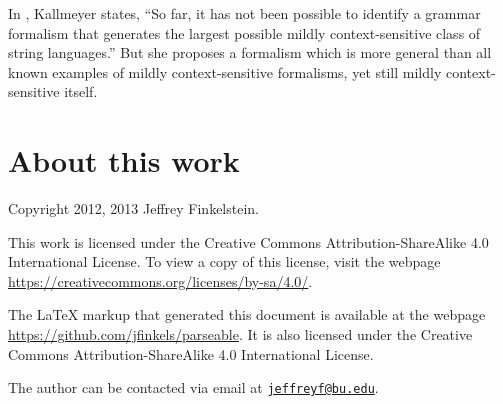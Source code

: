 \documentclass{article}
\theoremstyle{definition}
\newcommand{\email}[1]{\href{mailto:#1}{\nolinkurl{#1}}}
\begin{document}
In \cite{kallmeyer}, Kallmeyer states, ``So far, it has not been possible to identify a grammar formalism that generates the largest possible mildly context-sensitive class of string languages.''
But she proposes a formalism which is more general than all known examples of mildly context-sensitive formalisms, yet still mildly context-sensitive itself.

\section{About this work}

Copyright 2012, 2013 Jef{}frey Finkelstein.

This work is licensed under the Creative Commons Attribution-ShareAlike 4.0 International License.
To view a copy of this license, visit the webpage \mbox{\url{https://creativecommons.org/licenses/by-sa/4.0/}}.

The \LaTeX{} markup that generated this document is available at the webpage \mbox{\url{https://github.com/jfinkels/parseable}}.
It is also licensed under the Creative Commons Attribution-ShareAlike 4.0 International License.

The author can be contacted via email at \email{jeffreyf@bu.edu}.
\end{document}
